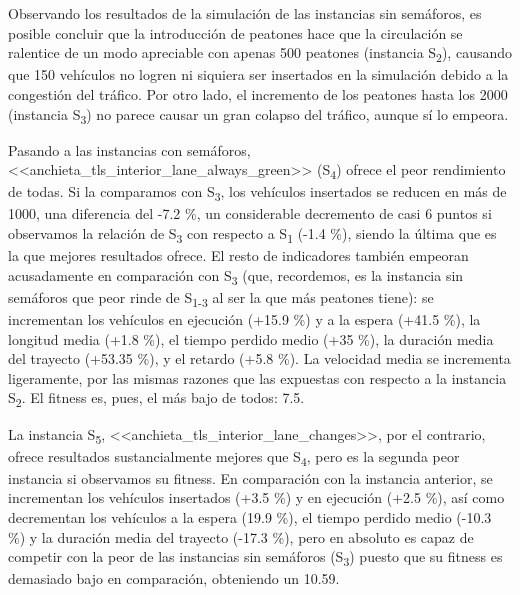 Observando los resultados de la simulación de las instancias sin semáforos, es posible concluir que la introducción de peatones hace que la circulación se ralentice de un modo apreciable con apenas 500 peatones (instancia S\textsubscript{2}), causando que 150 vehículos no logren ni siquiera ser insertados en la simulación debido a la congestión del tráfico. Por otro lado, el incremento de los peatones hasta los 2000 (instancia S\textsubscript{3}) no parece causar un gran colapso del tráfico, aunque sí lo empeora.

Pasando a las instancias con semáforos, <<anchieta\_tls\_interior\_lane\_always\_green>> (S\textsubscript{4}) ofrece el peor rendimiento de todas. Si la comparamos con S\textsubscript{3}, los vehículos insertados se reducen en más de 1000, una diferencia del -7.2 \%, un considerable decremento de casi 6 puntos si observamos la relación de S\textsubscript{3} con respecto a S\textsubscript{1} (-1.4 \%), siendo la última que es la que mejores resultados ofrece. El resto de indicadores también empeoran acusadamente en comparación con S\textsubscript{3} (que, recordemos, es la instancia sin semáforos que peor rinde de S\textsubscript{1-3} al ser la que más peatones tiene): se incrementan los vehículos en ejecución (+15.9 \%) y a la espera (+41.5 \%), la longitud media (+1.8 \%), el tiempo perdido medio (+35 \%), la duración media del trayecto (+53.35 \%), y el retardo (+5.8 \%). La velocidad media se incrementa ligeramente, por las mismas razones que las expuestas con respecto a la instancia S\textsubscript{2}. El fitness es, pues, el más bajo de todos: 7.5.

La instancia S\textsubscript{5}, <<anchieta\_tls\_interior\_lane\_changes>>, por el contrario, ofrece resultados sustancialmente mejores que S\textsubscript{4}, pero es la segunda peor instancia si observamos su fitness. En comparación con la instancia anterior, se incrementan los vehículos insertados (+3.5 \%) y en ejecución (+2.5 \%), así como decrementan los vehículos a la espera (19.9 \%), el tiempo perdido medio (-10.3 \%) y la duración media del trayecto (-17.3 \%), pero en absoluto es capaz de competir con la peor de las instancias sin semáforos (S\textsubscript{3}) puesto que su fitness es demasiado bajo en comparación, obteniendo un 10.59.

